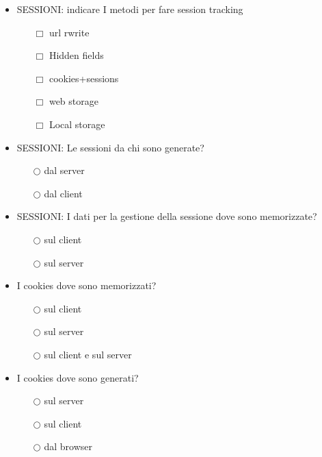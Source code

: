 \documentclass[10pt,twocolumn]{article}
\begin{document}
\begin{itemize}
    \item SESSIONI: indicare I metodi per fare session tracking
          \begin{itemize}
              \item[$\Box$] url rwrite
              \item[$\Box$] Hidden fields
              \item[$\Box$] cookies+sessions
              \item[$\Box$] web storage
              \item[$\Box$] Local storage
          \end{itemize}
\end{itemize}
\begin{itemize}
    \item SESSIONI: Le sessioni da chi sono generate?
          \begin{itemize}
              \item[$\bigcirc$] dal server
              \item[$\bigcirc$] dal client
          \end{itemize}
\end{itemize}
\begin{itemize}
    \item SESSIONI: I dati per la gestione della sessione dove sono memorizzate?
          \begin{itemize}
              \item[$\bigcirc$] sul client
              \item[$\bigcirc$] sul server
          \end{itemize}
\end{itemize}
\begin{itemize}
    \item I cookies dove sono memorizzati?
          \begin{itemize}
              \item[$\bigcirc$] sul client
              \item[$\bigcirc$] sul server
              \item[$\bigcirc$] sul client e sul server
          \end{itemize}
\end{itemize}
\begin{itemize}
    \item I cookies dove sono generati?
          \begin{itemize}
              \item[$\bigcirc$] sul server
              \item[$\bigcirc$] sul client
              \item[$\bigcirc$] dal browser
          \end{itemize}
\end{itemize}
\end{document}
